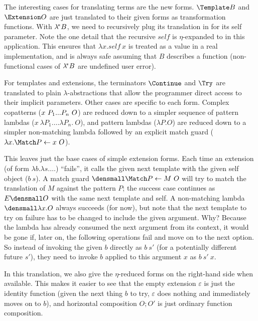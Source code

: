 The interesting cases for translating terms are the new forms.
$\Template B$ and $\Extension O$ are just translated to their given forms as transformation functions.
With $\lambda^{\!*} B$, we need to recursively plug its translation in for its self parameter.
Note the one detail that the recursive $\mathit{self}$ is $\eta$-expanded to in this application.
This ensures that $\lambda x. \mathit{self} ~ x$ is treated as a value in a real implementation, and is always safe assuming that $B$ describes a function (non-functional cases of $\lambda^{\!*} B$ are undefined user error).

For templates and extensions, the terminators $\Continue$ and $\Try$ are translated to plain $\lambda$-abstractions that allow the programmer direct access to their implicit parameters.
Other cases are specific to each form.
Complex copatterns ($x ~ P_1\overset{{}_{}}{...} P_n ~ O$) are reduced down to a simpler sequence of pattern lambdas ($x ~ \lambda P_1. \dots \lambda P_n. ~ O$), and pattern lambdas ($\lambda P. O$) are reduced down to a simpler non-matching lambda followed by an explicit match guard ($\lambda x. \Match P \gets x ~ O$).

This leaves just the base cases of simple extension forms.
Each time an extension (of form $\lambda b. \lambda s. \dots$) ``fails'', it calls the given next template with the given self object ($b~s$).
A match guard $\den{\Match P \gets M ~ O}$ will try to match the translation of $M$ against the pattern $P$; the success case continues as $E\den{O}$ with the same next template and self.
A non-matching lambda $\den{\lambda x. O}$ always succeeds (for now), but note that the next template to try on failure has to be changed to include the given argument.
Why?
Because the lambda has already consumed the next argument from its context, it would be gone if, later on, the following operations fail and move on to the next option.
So instead of invoking the given $b$ directly as $b~s'$ (for a potentially different future $s'$), they need to invoke $b$ applied to this argument $x$ as $b~s'~x$.

In this translation, we also give the $\eta$-reduced forms on the right-hand side when available.
This makes it easier to see that the empty extension $\varepsilon$ is just the identity function (given the next thing $b$ to try, $\varepsilon$ does nothing and immediately moves on to $b$), and horizontal composition $O; O'$ is just ordinary function composition.


